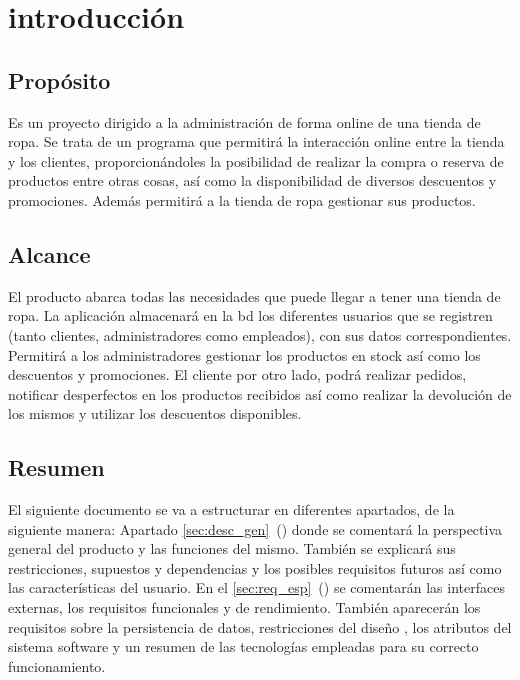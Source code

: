 \section{introducción}
\subsection{Propósito}
Es un proyecto dirigido a la administración de forma online de una tienda de ropa. Se trata de un programa que permitirá la interacción online entre la tienda y los clientes, proporcionándoles la posibilidad de realizar la compra o reserva de productos entre otras cosas, así como la disponibilidad de diversos descuentos y promociones.
Además permitirá a la tienda de ropa gestionar sus productos.
\subsection{Alcance}
El producto abarca todas las necesidades que puede llegar a tener una tienda de ropa. La aplicación almacenará en la \gls{bd} los diferentes usuarios que se registren (tanto clientes, administradores como empleados), con sus datos correspondientes.
Permitirá a los administradores gestionar los productos en stock así como los descuentos y promociones. El cliente por otro lado, podrá realizar pedidos, notificar desperfectos en los productos recibidos así como realizar la devolución de los mismos y utilizar los descuentos disponibles.

\glsaddall
\nocite{*}
{
    \printglossary[title=Definiciones\, acrónimos y abreviaturas, numberedsection]}



\subsection{Resumen}
El siguiente documento se va a estructurar en diferentes apartados, de la siguiente manera: Apartado \ref{sec:desc_gen}~() donde se comentará la perspectiva general del producto y las funciones del mismo. También se explicará sus restricciones, supuestos y dependencias y los posibles requisitos futuros así como las características del usuario.
En el \ref{sec:req_esp}~() se comentarán las interfaces externas, los requisitos funcionales y de rendimiento. También aparecerán los requisitos sobre la persistencia de datos, restricciones del diseño , los atributos del sistema software y un resumen de las tecnologías empleadas para su correcto funcionamiento.
